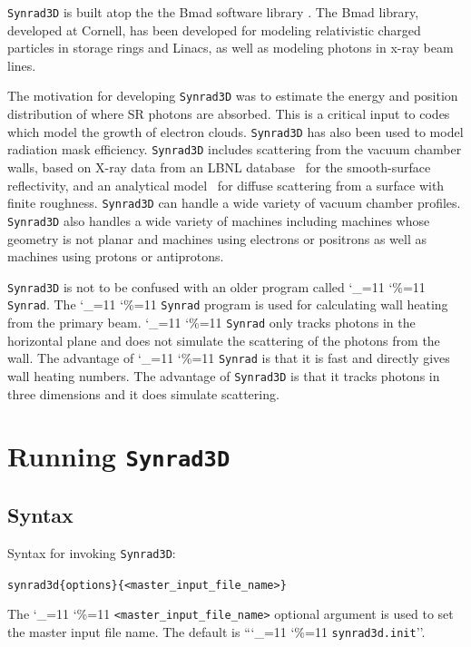 \documentclass[11pt,openany]{report}
\newcommand{\srthree}{\texttt{Synrad3D}\xspace}
\newcommand\ttcmd{\begingroup\catcode`\_=11 \catcode`\%=11 \dottcmd}
\newcommand\dottcmd[1]{\texttt{#1}\endgroup}
\newcommand{\vn}{\ttcmd}
\newlength{\ExBeg}
\newlength{\ExEnd}
\newenvironment{example}
  {\vspace{\ExBeg} \begin{alltt}}
  {\end{alltt} \vspace{\ExEnd}}
\begin{document}
\srthree is built atop the the Bmad software library
\cite{b:bmad}. The Bmad library, developed at Cornell, has been
developed for modeling relativistic charged particles in storage rings
and Linacs, as well as modeling photons in x-ray beam lines.

The motivation for developing \srthree was to estimate the energy and
position distribution of where SR photons are absorbed. This is a
critical input to codes which model the growth of electron clouds.
\srthree has also been used to model radiation mask efficiency.
\srthree includes scattering from the vacuum chamber walls, based on
X-ray data from an LBNL database~\cite{b:henke} for the smooth-surface
reflectivity, and an analytical model~\cite{b:beckmann,b:ogilvy} for
diffuse scattering from a surface with finite roughness. \srthree can
handle a wide variety of vacuum chamber profiles. \srthree also
handles a wide variety of machines including machines whose geometry
is not planar and machines using electrons or positrons as well as
machines using protons or antiprotons.

\srthree is not to be confused with an older program called
\vn{Synrad}. The \vn{Synrad} program is used for calculating wall
heating from the primary beam. \vn{Synrad} only tracks photons in the
horizontal plane and does not simulate the scattering of the photons
from the wall. The advantage of \vn{Synrad} is that it is fast and
directly gives wall heating numbers. The advantage of \srthree is that
it tracks photons in three dimensions and it does simulate scattering.

\chapter{Running \srthree} 
\label{s:run}

\section{Syntax}

Syntax for invoking \srthree:
\begin{example}
  synrad3d \{options\} \{<master_input_file_name>\}
\end{example}

The \vn{<master_input_file_name>} optional argument is used to set the
master input file name. The default is ``\vn{synrad3d.init}''. 
\end{document}
